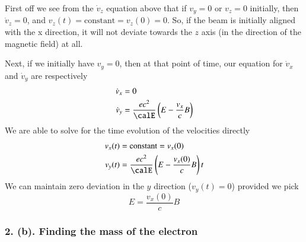 {First off we see from the \(\dot{v}_z\) equation above that if \(v_y = 0\) or \(v_z = 0\) initially, then \(\dot{v}_z = 0\), and \(v_z(t) = \text{constant} = v_z(0) = 0\).  So, if the beam is initially aligned with the x direction, it will not deviate towards the \(z\) axis (in the direction of the magnetic field) at all.

Next, if we initially have \(v_y = 0\), then at that point of time, our equation for \(\dot{v}_x\) and \(\dot{v}_y\) are respectively
%
\begin{equation}\label{eqn:relElectroDynProblemSet2:370}
\begin{aligned}
\dot{v}_x &= 0 \\
\dot{v}_y &= \frac{e c^2}{\calE} \left( E - \frac{v_x}{c} B \right)
\end{aligned}
\end{equation}
%
We are able to solve for the time evolution of the velocities directly
%
\begin{equation}\label{eqn:relElectroDynProblemSet2:390}
\begin{aligned}
v_x(t) &= \text{constant} = v_x(0) \\
v_y(t) &= \frac{e c^2}{\calE} \left( E - \frac{v_x(0)}{c} B \right) t
\end{aligned}
\end{equation}
%
We can maintain zero deviation in the \(y\) direction (\(v_y(t) = 0\)) provided we pick
%
\begin{equation}\label{eqn:relElectroDynProblemSet2:410}
E = \frac{v_x(0)}{c} B
\end{equation}
%
\subsubsection{2. (b). Finding the mass of the electron}

}
